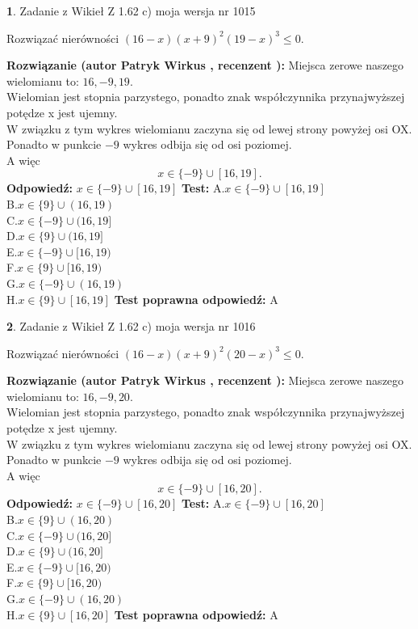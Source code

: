\documentclass[12pt, a4paper]{article}
\theoremstyle{definition} %
\newtheorem{zad}{}
\newcommand{\zadStart}[1]{\begin{zad}#1\newline}
\newcommand{\zadStop}{\end{zad}}
\newcommand{\rozwStart}[2]{\noindent \textbf{Rozwiązanie (autor #1 , recenzent #2): }\newline}
\newcommand{\rozwStop}{\newline}
\newcommand{\odpStart}{\noindent \textbf{Odpowiedź:}\newline}
\newcommand{\odpStop}{\newline}
\newcommand{\testStart}{\noindent \textbf{Test:}\newline}
\newcommand{\testStop}{\newline}
\newcommand{\kluczStart}{\noindent \textbf{Test poprawna odpowiedź:}\newline}
\newcommand{\kluczStop}{\newline}
\begin{document}
\zadStart{Zadanie z Wikieł Z 1.62 c) moja wersja nr 1015}

Rozwiązać nierówności $(16-x)(x+9)^{2}(19-x)^{3}\le0$.
\zadStop
\rozwStart{Patryk Wirkus}{}
Miejsca zerowe naszego wielomianu to: $16, -9, 19$.\\
Wielomian jest stopnia parzystego, ponadto znak współczynnika przy\linebreak najwyższej potędze x jest ujemny.\\ W związku z tym wykres wielomianu zaczyna się od lewej strony powyżej osi OX.\\
Ponadto w punkcie $-9$ wykres odbija się od osi poziomej.\\
A więc $$x \in \{-9\} \cup [16,19].$$
\rozwStop
\odpStart
$x \in \{-9\} \cup [16,19]$
\odpStop
\testStart
A.$x \in \{-9\} \cup [16,19]$\\
B.$x \in \{9\} \cup (16,19)$\\
C.$x \in \{-9\} \cup (16,19]$\\
D.$x \in \{9\} \cup (16,19]$\\
E.$x \in \{-9\} \cup [16,19)$\\
F.$x \in \{9\} \cup [16,19)$\\
G.$x \in \{-9\} \cup (16,19)$\\
H.$x \in \{9\} \cup [16,19]$
\testStop
\kluczStart
A
\kluczStop



\zadStart{Zadanie z Wikieł Z 1.62 c) moja wersja nr 1016}

Rozwiązać nierówności $(16-x)(x+9)^{2}(20-x)^{3}\le0$.
\zadStop
\rozwStart{Patryk Wirkus}{}
Miejsca zerowe naszego wielomianu to: $16, -9, 20$.\\
Wielomian jest stopnia parzystego, ponadto znak współczynnika przy\linebreak najwyższej potędze x jest ujemny.\\ W związku z tym wykres wielomianu zaczyna się od lewej strony powyżej osi OX.\\
Ponadto w punkcie $-9$ wykres odbija się od osi poziomej.\\
A więc $$x \in \{-9\} \cup [16,20].$$
\rozwStop
\odpStart
$x \in \{-9\} \cup [16,20]$
\odpStop
\testStart
A.$x \in \{-9\} \cup [16,20]$\\
B.$x \in \{9\} \cup (16,20)$\\
C.$x \in \{-9\} \cup (16,20]$\\
D.$x \in \{9\} \cup (16,20]$\\
E.$x \in \{-9\} \cup [16,20)$\\
F.$x \in \{9\} \cup [16,20)$\\
G.$x \in \{-9\} \cup (16,20)$\\
H.$x \in \{9\} \cup [16,20]$
\testStop
\kluczStart
A
\kluczStop
\end{document}
